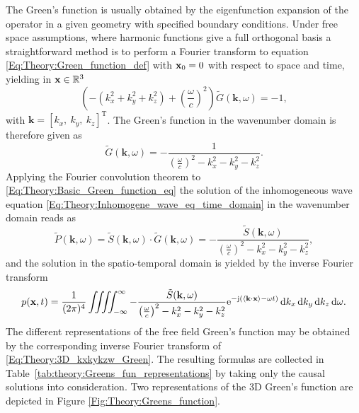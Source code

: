 The Green's function is usually obtained by the eigenfunction expansion of the operator in a given geometry with specified boundary conditions. 
Under free space assumptions, where harmonic functions give a full orthogonal basis a straightforward method is to perform a Fourier transform to equation \eqref{Eq:Theory:Green_function_def} with $\mathbf{x}_0 = 0$ with respect to space and time, yielding in $\mathbf{x} \in \mathbb{R}^{3}$
\begin{equation}
\left(-(k_x^2 + k_y^2 + k_z^2) + \left(\frac{\omega}{c} \right)^2\right)\tilde{G}(\mathbf{k},\omega) = -1,
\end{equation}
with $\mathbf{k} = [k_x,\ k_y,\ k_z]^{\mathrm{T}}$.
The Green's function in the wavenumber domain is therefore given as \cite{Devaney2012, Watanabe2015}
\begin{equation}
\tilde{G}(\mathbf{k},\omega) = -\frac{1}{\left( \frac{\omega}{c}\right)^2 -  k_x^2 - k_y^2 - k_z^2 }.
\label{Eq:Theory:3D_kxkykzw_Green}
\end{equation}
Applying the Fourier convolution theorem to \eqref{Eq:Theory:Basic_Green_function_eq} the solution of the inhomogeneous wave equation \eqref{Eq:Theory:Inhomogene_wave_eq_time_domain} in the wavenumber domain reads as
\begin{equation}
\tilde{P}(\mathbf{k},\omega)  = \tilde{S}(\mathbf{k},\omega) \cdot \tilde{G}(\mathbf{k},\omega) = -\frac{\tilde{S}(\mathbf{k},\omega)}{\left( \frac{\omega}{c}\right)^2 -  k_x^2 - k_y^2 - k_z^2 },
\end{equation}
and the solution in the spatio-temporal domain is yielded by the inverse Fourier transform
\begin{equation}
p(\mathbf{x},t) =\frac{1}{(2\pi)^4} \iiiint^{\infty}_{-\infty} - \frac{\tilde{S}(\mathbf{k},\omega)}{\left( \frac{\omega}{c}\right)^2 -  k_x^2 - k_y^2 - k_z^2 } \mathrm{e}^{-\mathrm{j} \left( \left< \mathbf{k} \cdot \mathbf{x} \right> - \omega t \right) } \, \mathrm{d} k_x \, \mathrm{d} k_y \, \mathrm{d} k_z \, \mathrm{d} \omega.
\end{equation}
The different representations of the free field Green's function may be obtained by the corresponding inverse Fourier transform of \eqref{Eq:Theory:3D_kxkykzw_Green}.
The resulting formulas are collected in Table\ \ref{tab:theory:Greens_fun_representations} by taking only the causal solutions into consideration.
Two representations of the 3D Green's function are depicted in Figure \ref{Fig:Theory:Greens_function}.

